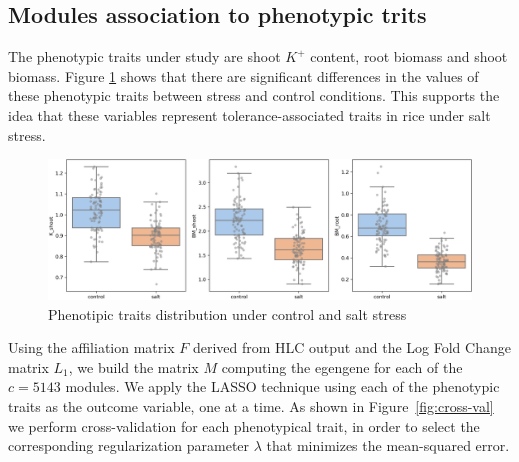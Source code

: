 \documentclass[12pt,journal, onecolumn]{IEEEtran}
\begin{document}
\subsection{Modules association to phenotypic trits}
The phenotypic traits under study are shoot $K^+$ content, root biomass and shoot biomass. Figure \ref{fig:pdata} shows that there are significant differences in the values of these phenotypic traits between stress and control conditions. This supports the idea that these variables represent tolerance-associated traits in rice under salt stress.

\begin{figure}[h]
  \centering
    \includegraphics[clip,width=1\textwidth]{Figures/phenotypic_traits.png}
  \caption{Phenotipic traits distribution under control and salt stress}
  \label{fig:pdata}
\end{figure}

Using the affiliation matrix $F$ derived from HLC output and the Log Fold Change matrix $L_1$, we build the matrix $M$ computing the egengene for each of the $c = 5143$ modules.
We apply the LASSO technique using each of the phenotypic traits as the outcome variable, one at a time. As shown in Figure~\ref{fig:cross-val} we perform cross-validation for each phenotypical trait, in order to select the corresponding regularization parameter $\lambda$ that minimizes the mean-squared error.\\
\end{document}
